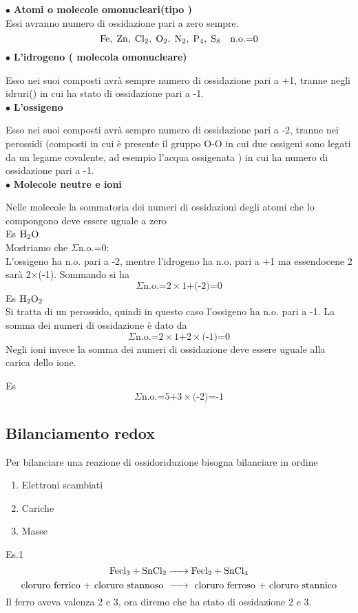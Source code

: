 $\bullet$ \textbf{Atomi o molecole omonucleari(tipo )}\\
Essi avranno numero di ossidazione pari a zero sempre.
$$\ce{Fe,\;Zn,\;Cl_2,\;O_2,\;N_2,\;P_4,\;S_8}\quad \text{n.o.=0}$$
$\bullet$  \textbf{L'idrogeno ( molecola omonucleare)}

Esso nei suoi composti avrà sempre numero di ossidazione pari a +1, tranne negli idruri() in cui ha stato di ossidazione pari a -1.\\
$\bullet$  \textbf{L'ossigeno}

Esso nei suoi composti avrà sempre numero di ossidazione pari a -2, tranne nei perossidi (composti in cui è presente il gruppo O-O in cui due ossigeni sono legati da un legame covalente, ad esempio l'acqua ossigenata ) in cui ha numero di ossidazione pari a -1.\\
$\bullet$  \textbf{Molecole neutre e ioni}

Nelle molecole la sommatoria dei numeri di ossidazioni degli atomi che lo compongono deve essere uguale a zero\\

Es $\ce{H_2O}\qquad$\\
Mostriamo che $\Sigma$n.o.=0:\\
L'ossigeno ha n.o. pari a -2, mentre l'idrogeno ha n.o. pari a +1 ma essendocene 2 sarà 2$\times$(-1). Sommando si ha\\
$$\Sigma \text{n.o.=2} \times \text{1+(-2)=0}$$
Es $\ce{H_2O_2}$\\
Si tratta di un perossido, quindi in questo caso l'ossigeno ha n.o. pari a -1. La somma dei numeri di ossidazione è dato da\\
$$\Sigma \text{n.o.=2} \times \text{1+2} \times \text{(-1)=0}$$
Negli ioni invece la somma dei numeri di ossidazione deve essere uguale alla carica dello ione.

Es 
$$\Sigma \text{n.o.=5+3} \times \text{(-2)=-1}$$
\subsection{Bilanciamento redox}
Per bilanciare una reazione di ossidoriduzione bisogna bilanciare in ordine
\begin{enumerate}
    \item Elettroni scambiati
    \item Cariche
    \item Masse
  \end{enumerate}
Es.1 
$$\ce{Fecl_3 + SnCl_2 -> Fecl_2 + SnCl_4}$$
$$\text{cloruro ferrico + cloruro stannoso \ce{->} cloruro ferroso + cloruro stannico}$$
Il ferro aveva valenza 2 e 3, ora diremo che ha stato di ossidazione 2 e 3.

